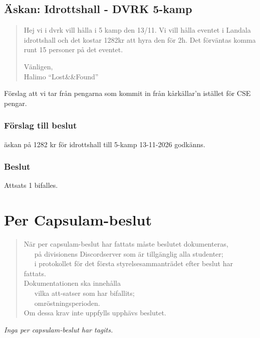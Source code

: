 \documentclass[protokoll]{dvd}
\begin{document}
\subsection{Äskan: Idrottshall - DVRK 5-kamp}
\begin{quote}
Hej vi i dvrk vill hålla i 5 kamp den 13/11. Vi vill hålla eventet i Landala idrottshall och det kostar 1282kr att hyra den för 2h. Det förväntas komma runt 15 personer på det eventet.

Vänligen,\\
Halimo ``Lost\&\&Found''
\end{quote}

Förslag att vi tar från pengarna som kommit in från kårkällar'n istället för CSE pengar.

\subsubsection*{Förslag till beslut}
\begin{attsatser}     
\item äskan på 1282 kr för idrottshall till 5-kamp 13-11-2026 godkänns.
\end{attsatser}
\subsubsection*{Beslut} 
\begin{attsatser}     
\item Attsats 1 bifalles. 
\end{attsatser}

\section{Per Capsulam-beslut}
\blockquote[]{
När per capsulam-beslut har fattats måste beslutet dokumenteras,\\
\ \cdot\ \ på divisionens Discordserver som är tillgänglig alla studenter;\\
\ \cdot\ \ i protokollet för det första styrelsesammanträdet efter beslut har fattats.\\

Dokumentationen ska innehålla\\
\ \cdot\ \ vilka att-satser som har bifallits;\\
\ \cdot\ \ omröstningsperioden.\\

Om dessa krav inte uppfylls upphävs beslutet.
}

\textit{Inga per capsulam-beslut har tagits.}
\end{document}
